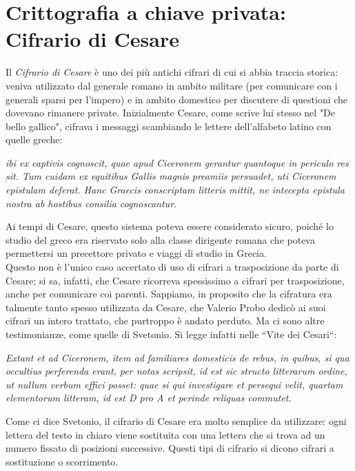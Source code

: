 \documentclass[italian,A4,12pt]{article}
\begin{document}
    \section{Crittografia a chiave privata: Cifrario di Cesare}
    Il \textit{Cifrario di Cesare} è uno dei più antichi cifrari di cui si abbia traccia storica: veniva utilizzato dal generale romano in ambito militare (per comunicare con i generali sparsi per l'impero) e in ambito domestico per discutere di questioni che dovevano rimanere private.
    Inizialmente Cesare, come scrive lui stesso nel "De bello gallico", cifrava i messaggi scambiando le lettere dell'alfabeto latino con quelle greche:
    \begin{displayquote}
      \textit{ibi ex captivis cognoscit, quae apud Ciceronem gerantur quantoque in periculo res sit.
      Tum cuidam ex equitibus Gallis magnis preamiis persuadet, uti Ciceronem epistulam deferat.
      Hanc Graecis conscriptam litteris mittit, ne intecepta epistula nostra ab hostibus consilia cognoscantur.}
    \end{displayquote}
    Ai tempi di Cesare, questo sistema poteva essere considerato sicuro, poiché lo studio del greco era riservato solo alla classe dirigente romana che poteva permettersi un precettore privato e viaggi di studio in Grecia.\\
    Questo non è l’unico caso accertato di uso di cifrari a trasposizione da parte di Cesare; si sa, infatti, che Cesare ricorreva spessissimo a cifrari per trasposizione, anche per comunicare coi parenti. Sappiamo, in proposito che la cifratura era talmente tanto spesso utilizzata da Cesare, che Valerio Probo dedicò ai suoi cifrari un intero trattato, che purtroppo è andato perduto. Ma ci sono altre testimonianze, come quelle di Svetonio. Si legge infatti nelle “Vite dei Cesari“:
    \begin{displayquote}
      \textit{Extant et ad Ciceronem, item ad familiares domesticis de rebus, in quibus, si qua occultius perferenda erant, per notas scripsit, id est sic structo litterarum ordine, ut nullum verbum effici posset: quae si qui investigare et persequi velit, quartam elementorum litteram, id est D pro A et perinde reliquas commutet.\\}
    \end{displayquote}
    Come ci dice Svetonio, il cifrario di Cesare era molto semplice da utilizzare: ogni lettera del testo in chiaro viene sostituita con una lettera che si trova ad un numero fissato di posizioni successive. Questi tipi di cifrario si dicono cifrari a sostituzione o scorrimento.\\
\end{document}
